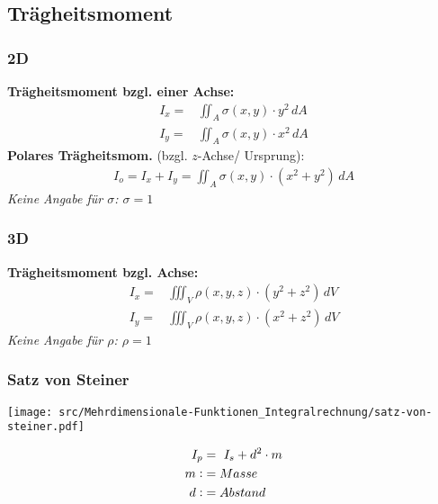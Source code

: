 \subsection{Trägheitsmoment}
    \subsubsection{2D}
        \textbf{Trägheitsmoment bzgl. einer Achse:}
        \begin{align*}
            I_x =& \iint_A \sigma(x,y) \cdot y^2 \, dA\\
            I_y =& \iint_A \sigma(x,y) \cdot x^2 \, dA
        \end{align*}
        \textbf{Polares Trägheitsmom.} (bzgl. $z$-Achse/ Ursprung):
        \begin{align*}
            I_o = I_x + I_y = \iint_A \sigma(x,y) \cdot (x^2 + y^2) \, dA 
        \end{align*}
        \textit{Keine Angabe für $\sigma$: $\sigma = 1$}

    \subsubsection{3D}
        \textbf{Trägheitsmoment bzgl. Achse:}
        \begin{align*}
            I_x =& \iiint_V \rho(x,y,z) \cdot (y^2 + z^2) \, dV\\
            I_y =& \iiint_V \rho(x,y,z) \cdot (x^2 + z^2) \, dV
        \end{align*}
        \textit{Keine Angabe für $\rho$: $\rho = 1$}
        
    \subsubsection{Satz von Steiner}
    \begin{minipage}{0.5\linewidth}
        \texttt{[image: src/Mehrdimensionale-Funktionen\_Integralrechnung/satz-von-steiner.pdf]}
    \end{minipage}
    \hspace{0.05\linewidth}
    \begin{minipage}{0.4\linewidth}
        \begin{align*}
            I_p &=\,\, I_s + d^2 \cdot m\\
            m \vcentcolon&= Masse\\
            d \vcentcolon&= Abstand\\
        \end{align*}
    \end{minipage}